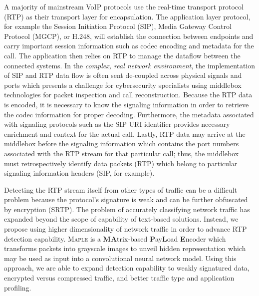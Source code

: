 A majority of mainstream VoIP protocols use the real-time transport protocol (RTP) as their transport layer for encapsulation. The application layer protocol, for example the Session Initiation Protocol (SIP), Media Gateway Control Protocol (MGCP), or H.248, will establish the connection between endpoints and carry important session information such as codec encoding and metadata for the call. The application then relies on RTP to manage the dataflow between the connected systems. In the \textit{complex, real network environment}, the implementation of SIP and RTP data flow is often sent de-coupled across physical signals and ports which presents a challenge for cybersecurity specialists using middlebox technologies for packet inspection and call reconstruction. Because the RTP data is encoded, it is necessary to know the signaling information in order to retrieve the codec information for proper decoding. Furthermore, the metadata associated with signaling protocols such as the SIP URI identifier provides necessary enrichment and context for the actual call. Lastly, RTP data may arrive at the middlebox before the signaling information which contains the port numbers associated with the RTP stream for that particular call; thus, the middlebox must retrospectively identify data packets (RTP) which belong to particular signaling information headers (SIP, for example).

Detecting the RTP stream itself from other types of traffic can be a difficult problem because the protocol's signature is weak and can be further obfuscated by encryption (SRTP). The problem of accurately classifying network traffic has expanded beyond the scope of capability of text-based solutions. Instead, we propose using higher dimensionality of network traffic in order to advance RTP detection capability. \textsc{Maple} is a \textbf{MA}trix-based \textbf{P}ay\textbf{L}oad \textbf{E}ncoder which transforms packets into grayscale images to unveil hidden representation which may be used as input into a convolutional neural network model. Using this approach, we are able to expand detection capability to weakly signatured data, encrypted versus compressed traffic, and better traffic type and application profiling.
